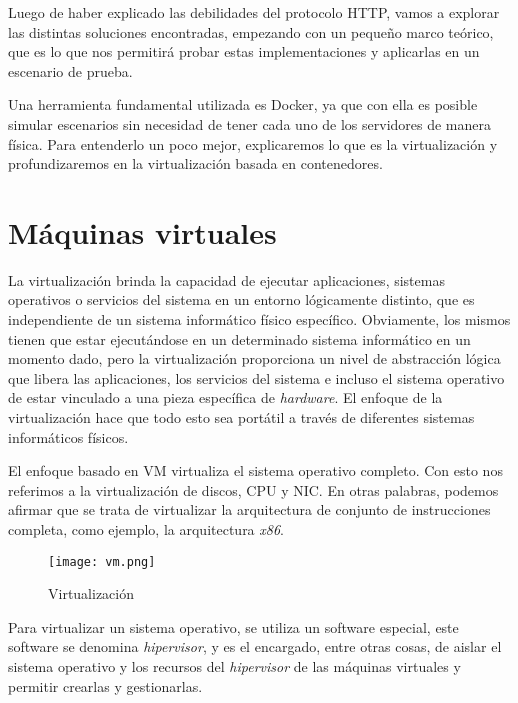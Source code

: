 
Luego de haber explicado las debilidades del protocolo HTTP, vamos a explorar las 
distintas soluciones encontradas, empezando con un pequeño marco teórico, que es lo que 
nos permitirá probar estas implementaciones y aplicarlas en un escenario de prueba.

Una herramienta fundamental utilizada es Docker, ya que con ella es posible simular 
escenarios sin necesidad de tener cada uno de los servidores de manera física. Para
entenderlo un poco mejor, explicaremos lo que es la virtualización y profundizaremos 
en la virtualización basada en contenedores.
    
\section{Máquinas virtuales}

La virtualización brinda la capacidad de ejecutar aplicaciones, sistemas 
operativos o servicios del sistema en un entorno lógicamente distinto, 
que es independiente de un sistema informático físico específico. 
Obviamente, los mismos tienen que estar ejecutándose en un determinado 
sistema informático en un momento dado, pero la virtualización proporciona 
un nivel de abstracción lógica que libera las aplicaciones, los servicios 
del sistema e incluso el sistema operativo de estar vinculado a una 
pieza específica de \emph{hardware}. El enfoque de la virtualización hace 
que todo esto sea portátil a través de diferentes sistemas informáticos 
físicos.

El enfoque basado en VM virtualiza el sistema operativo completo. Con esto nos referimos 
a la virtualización de discos, CPU y NIC. En otras palabras, podemos afirmar que se 
trata de virtualizar la arquitectura de conjunto de instrucciones completa, como ejemplo, 
la arquitectura \emph{x86}. 

\begin{center}
    \begin{figure}   
       \begin{center}
          \texttt{[image: vm.png]}
       \end{center}
       \caption{Virtualización}
    \end{figure}
 \end{center}

Para virtualizar un sistema operativo, se utiliza un software especial, este software 
se denomina \emph{hipervisor}, y es el encargado, entre otras cosas, de aislar el sistema 
operativo y los recursos del \emph{hipervisor} de las máquinas virtuales y permitir crearlas 
y gestionarlas.

